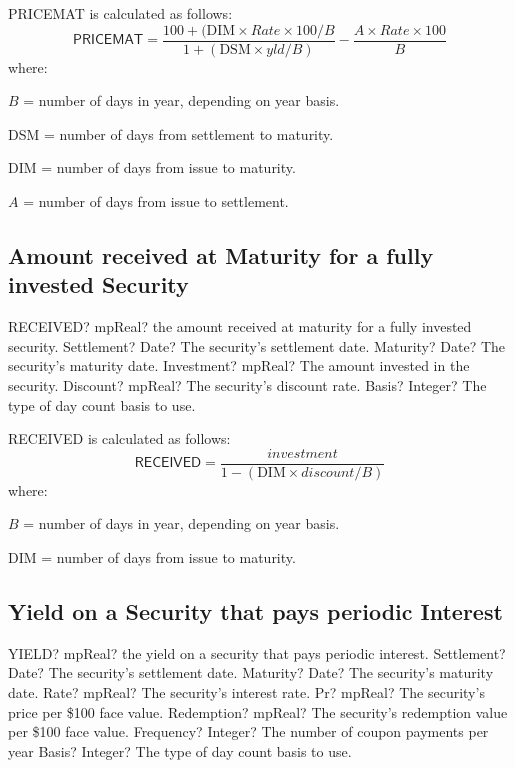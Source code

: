 \vspace{0.3cm}
PRICEMAT is calculated as follows:
\begin{equation}
\textsf{PRICEMAT} = \frac{100 + (\text{DIM} \times Rate \times 100 / B}{1+(\text{DSM} \times yld / B)} - \frac{A \times Rate \times 100}{B}
\end{equation}
where:

$B$ = number of days in year, depending on year basis.

DSM = number of days from settlement to maturity.

DIM = number of days from issue to maturity.

$A$ = number of days from issue to settlement.




\subsection{Amount received at Maturity for a fully invested Security}

\begin{mpFunctionsExtract}
	\mpWorksheetFunctionFiveNotImplemented
	{RECEIVED? mpReal? the amount received at maturity for a fully invested security.}
	{Settlement? Date?  The security's settlement date.}
	{Maturity? Date? The security's maturity date.}
	{Investment? mpReal? The amount invested in the security.}
	{Discount? mpReal? The security's discount rate.}
	{Basis? Integer? The type of day count basis to use.}
\end{mpFunctionsExtract}

\vspace{0.3cm}
RECEIVED is calculated as follows: 
\begin{equation}
\textsf{RECEIVED} = \frac{investment}{1-(\text{DIM} \times discount / B)} 
\end{equation}
where:

$B$ = number of days in year, depending on year basis.

DIM = number of days from issue to maturity.




\subsection{Yield on a Security that pays periodic Interest}


\begin{mpFunctionsExtract}
	\mpWorksheetFunctionSevenNotImplemented
	{YIELD? mpReal? the yield on a security that pays periodic interest.}
	{Settlement? Date?  The security's settlement date.}
	{Maturity? Date? The security's maturity date.}
	{Rate? mpReal? The security's interest rate.}
	{Pr? mpReal? The security's price per \$100 face value.}
	{Redemption? mpReal? The security's redemption value per \$100 face value.}
	{Frequency? Integer? The number of coupon payments per year}
	{Basis? Integer? The type of day count basis to use.}
\end{mpFunctionsExtract}


